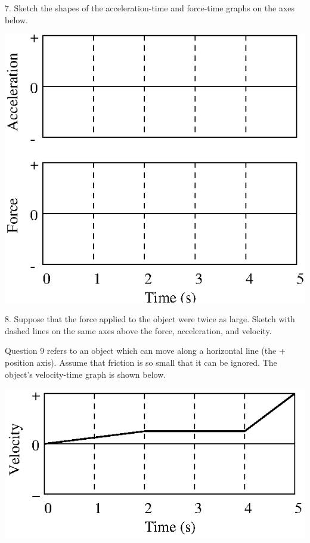 7. Sketch the shapes of the acceleration-time and force-time graphs on the axes
below.

\vspace{0.3cm}
{\par\centering \includegraphics[scale=1.1]{force1/force1_fig9.eps} \par}
\answerspace{0.3cm}

8. Suppose that the force applied to the object were twice as large. Sketch
with dashed lines on the same axes above the force, acceleration, and velocity.

\pagebreak[4]
Question 9 refers to an object which can move along a horizontal line (the +
position axis). Assume that friction is so small that it can be ignored. The
object's velocity-time graph is shown below.

\vspace{0.3cm}
{\par\centering \includegraphics{force1/force1_fig12.eps} \par}
\vspace{0.3cm}

